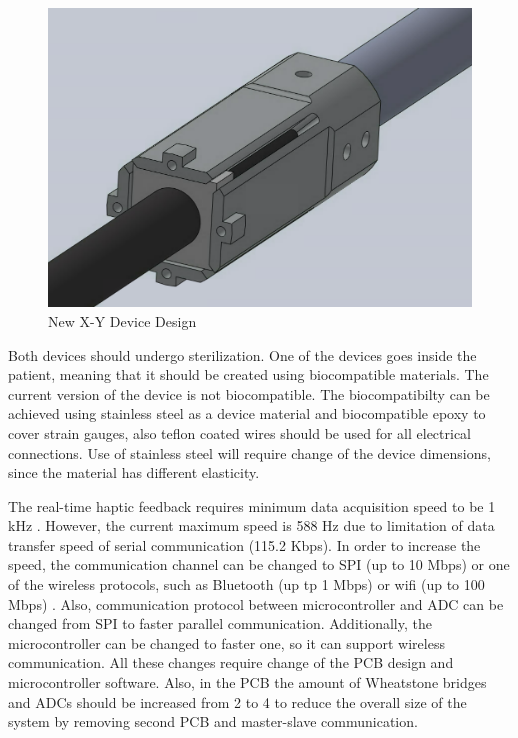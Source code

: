 \begin{figure}[h]
	\begin{center}
		\includegraphics[width=120mm]{fig/methods/new_xy_dev.png}
	\end{center}
	\vspace{-4mm}
	\caption[New X-Y Device Design]
	{New X-Y Device Design}
	\label{fig:NewXYDesign}
	\vspace{-2mm}
\end{figure}
	
	Both devices should undergo sterilization. One of the devices goes inside the patient, meaning that it should be created using biocompatible materials. The current version of the device is not biocompatible. The biocompatibilty can be achieved using stainless steel as a device material and biocompatible epoxy to cover strain gauges, also teflon coated wires should be used for all electrical connections. Use of stainless steel will require change of the device dimensions, since the material has different elasticity.
	
	The real-time haptic feedback requires minimum data acquisition speed to be 1 kHz \cite{seungmoon_choi_effect_2004}. However, the current maximum speed is 588 Hz due to limitation of data transfer speed of serial communication (115.2 Kbps). In order to increase the speed, the communication channel can be changed to SPI (up to 10 Mbps) \cite{_uart_porotocol} or one of the wireless protocols, such as Bluetooth (up tp 1 Mbps) or wifi (up to 100 Mbps) \cite{_wireless_protocols}. Also, communication protocol between microcontroller and ADC can be changed from SPI to faster parallel communication. Additionally, the microcontroller can be changed to faster one, so it can support wireless communication. All these changes require change of the PCB design and microcontroller software. Also, in the PCB the amount of Wheatstone bridges and ADCs should be increased from 2 to 4 to reduce the overall size of the system by removing second PCB and master-slave communication.
	
